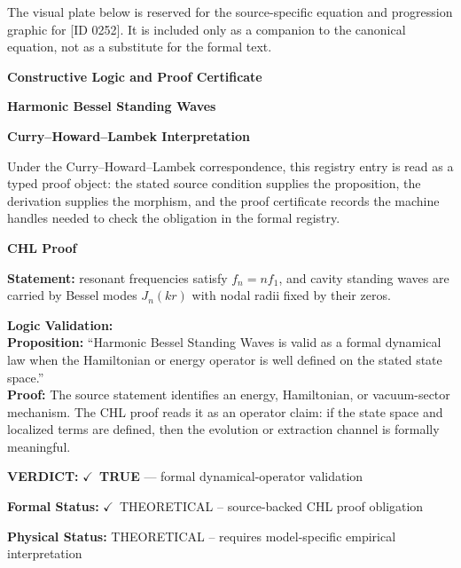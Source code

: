 \begingroup\footnotesize\sloppy
The visual plate below is reserved for the source-specific equation and progression graphic for [ID 0252]. It is included only as a companion to the canonical equation, not as a substitute for the formal text.
\par\endgroup
\ifTZPDarkEdition
{}
\fi

\clearpage
\begingroup\tzpsupportsetup
\noindent\textbf{\fontsize{10.8pt}{12.8pt}\selectfont [ID 0252] Constructive Logic and Proof Certificate}\par
\noindent\textbf{\fontsize{10pt}{12pt}\selectfont Harmonic Bessel Standing Waves}\par
\vspace{0.45em}
\begingroup
\footnotesize
\setlength{\parskip}{0.22em}
\setlength{\parindent}{0pt}
\noindent\textbf{Curry--Howard--Lambek Interpretation}\par
Under the Curry--Howard--Lambek correspondence, this registry entry is read as a typed proof
object: the stated source condition supplies the proposition, the derivation supplies the
morphism, and the proof certificate records the machine handles needed to check the obligation
in the formal registry.

\vspace{0.45em}
\noindent\textbf{CHL Proof}\par
\textbf{Statement:} resonant frequencies satisfy \(f_n=nf_1\), and cavity standing waves are carried by Bessel modes \(J_n(kr)\) with nodal radii fixed by their zeros.

\textbf{Logic Validation:}\\
\textbf{Proposition:} ``Harmonic Bessel Standing Waves is valid as a formal dynamical law when the Hamiltonian
or energy operator is well defined on the stated state space.''\\
\textbf{Proof:} The source statement identifies an energy, Hamiltonian, or vacuum-sector mechanism. The
CHL proof reads it as an operator claim: if the state space and localized terms are
defined, then the evolution or extraction channel is formally meaningful.

\textbf{VERDICT:} \ensuremath{\checkmark}\ \textbf{TRUE} --- formal dynamical-operator validation

\textbf{Formal Status:} \ensuremath{\checkmark}\ THEORETICAL -- source-backed CHL proof obligation

\textbf{Physical Status:} THEORETICAL -- requires model-specific empirical interpretation
\par\vspace{0.45em}
\par
\ifTZPDarkEdition
{}
\fi
\endgroup
\endgroup

